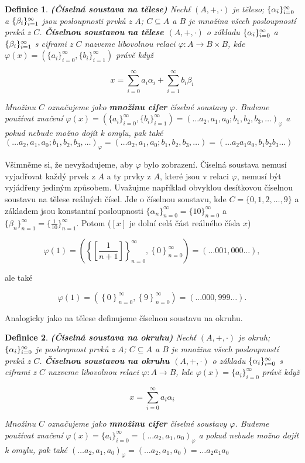 \documentclass[12pt]{book}
\newtheorem{definice}{Definice}
\begin{document}
\begin{definice} \textbf{(Číselná soustava na tělese)}
	Nechť $(A,+,\cdot)$ je těleso; $\{\alpha_i\}_{i=0}^{\infty}$ a $\{\beta_i\}_{i=1}^{\infty}$ jsou posloupnosti prvků z $A$; $C\subseteq A$ a $B$ je množina všech posloupností prvků z $C$.
	\textbf{Číselnou soustavou na tělese $(A,+,\cdot)$} o základu $\{\alpha_i\}_{i=0}^{\infty}$ a $\{\beta_i\}_{i=1}^{\infty}$ s ciframi z $C$ nazveme libovolnou relaci $\varphi : A \rightarrow B\times B$, kde 	$\varphi(x)=\left(\{a_{i}\}_{i=0}^{\infty},\{b_{i}\}_{i=1}^{\infty}\right)$ právě když

		$$x = \sum_{i=0}^{\infty} a_{i}\alpha_{i} + \sum_{i=1}^{\infty} b_{i}\beta_{i}$$

		Množinu $C$ označujeme jako \textbf{množinu cifer} číselné soustavy $\varphi$. Budeme používat značení $\varphi(x) = \left(\{a_{i}\}_{i=0}^{\infty},\{b_{i}\}_{i=1}^{\infty}\right) = (\dots a_2,a_1,a_0;b_1, b_2, b_3, \dots)_{\varphi}$ a pokud nebude možno dojít k omylu, pak také $(\dots a_2,a_1,a_0;b_1, b_2, b_3, \dots)_{\varphi} = (\dots a_2,a_1,a_0;b_1, b_2, b_3, \dots) = (\dots a_2a_1a_0,b_1 b_2 b_3 \dots)$
		\end{definice}

Všimněme si, že nevyžadujeme, aby $\varphi$ bylo zobrazení. Číselná soustava nemusí vyjadřovat každý prvek z $A$ a ty prvky z $A$, které jsou v relaci $\varphi$, nemusí být vyjádřeny jediným způsobem. Uvažujme například obvyklou desítkovou číselnou soustavu na tělese reálných čísel. Jde o číselnou soustavu, kde $C = \{0, 1, 2, \dots, 9\}$ a základem jsou konstantní posloupnosti $\{\alpha_n\}_{n = 0}^{\infty} = \{10\}_{n = 0}^{\infty}$ a $\{\beta_n\}_{n = 1}^{\infty} = \{\frac{1}{10}\}_{n = 1}^{\infty}$. Potom ($[x]$ je dolní celá část reálného čísla $x$)

$$\varphi(1) = \left(  \left\{ \left[\frac{1}{n+1} \right] \right\}_{n = 0}^{\infty} , \left\{ 0 \right\}_{n = 0}^{\infty} \right) = \left(\dots 001,000 \dots \right),$$

ale také

$$\varphi(1) = \left(  \left\{ 0 \right\}_{n = 0}^{\infty} , \left\{ 9 \right\}_{n = 0}^{\infty} \right) = \left(\dots 000,999 \dots \right).$$


Analogicky jako na tělese definujeme číselnou soustavu na okruhu.


\begin{definice} \textbf{(Číselná soustava na okruhu)}
	Nechť $(A,+,\cdot)$ je okruh; $\{\alpha_i\}_{i=0}^{\infty}$ je posloupnost prvků z $A$; $C\subseteq A$ a $B$ je množina všech posloupností prvků z $C$.
	\textbf{Číselnou soustavou na okruhu $(A,+,\cdot)$} o základu $\{\alpha_i\}_{i=0}^{\infty}$ s ciframi z $C$ nazveme libovolnou relaci $\varphi : A \rightarrow B$, kde 	$\varphi(x)= \{a_{i}\}_{i=0}^{\infty}$ právě když

		$$x = \sum_{i=0}^{\infty} a_{i}\alpha_{i}$$

		Množinu $C$ označujeme jako \textbf{množinu cifer} číselné soustavy $\varphi$. Budeme používat značení $\varphi(x) = \{a_{i}\}_{i=0}^{\infty} = (\dots a_2,a_1,a_0)_{\varphi}$ a pokud nebude možno dojít k omylu, pak také $(\dots a_2,a_1,a_0)_{\varphi} = (\dots a_2,a_1,a_0) = \dots a_2a_1a_0$
		\end{definice}
\end{document}
